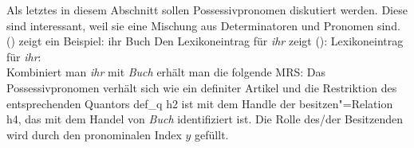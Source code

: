 Als letztes in diesem Abschnitt sollen Possessivpronomen diskutiert werden. Diese sind interessant,
weil sie eine Mischung aus Determinatoren und Pronomen sind. () zeigt ein Beispiel:
\ea
ihr Buch
\z
Den Lexikoneintrag für \emph{ihr} zeigt ():
\eas
Lexikoneintrag für \emph{ihr}:\\
\zs
Kombiniert man \emph{ihr} mit \emph{Buch} erhält man die folgende MRS:
\ea
{}
\z
Das Possessivpronomen verhält sich wie ein definiter Artikel und die Restriktion des entsprechenden
Quantors def\_q h2 ist \qeq mit dem Handle der besitzen"=Relation h4, das mit dem Handel von
\emph{Buch} identifiziert ist. Die Rolle des/der Besitzenden wird durch den pronominalen Index $y$ gefüllt.


